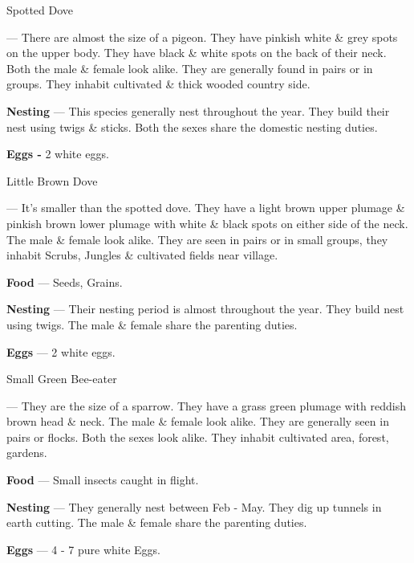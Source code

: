 \begin{bird}{Spotted Dove}

 --- There are almost the size of a pigeon. They have pinkish white \& grey spots on the upper body. They have black \& white spots on the back of their neck. Both the male \& female look alike. They are generally found in pairs or in groups. They inhabit cultivated \& thick wooded country side. 

{\large\bf Nesting} --- This species generally nest throughout the year. They build their nest using twigs \& sticks. Both the sexes share the domestic nesting duties.

{\large\bf Eggs -} 2 white eggs.
\end{bird}

\newpage

\begin{bird}{Little Brown Dove}

 --- It's smaller than the spotted dove. They have a light brown upper plumage \& pinkish brown lower plumage with white \& black spots on either side of the neck. The male \& female look alike. They are seen in pairs or in small groups, they inhabit Scrubs, Jungles \& cultivated fields near village. 

{\large\bf Food} --- Seeds, Grains.

{\large\bf Nesting} --- Their nesting period is almost throughout the year. They build nest using twigs. The male \& female share the parenting duties.

{\large\bf Eggs} --- 2 white eggs.
\end{bird}

\begin{bird}{Small Green Bee-eater}

 --- They are the size of a sparrow. They have a grass green plumage with reddish brown head \& neck. The male \& female look alike. They are generally seen in pairs or flocks. Both the sexes look alike. They inhabit cultivated area, forest, gardens.

{\large\bf Food} --- Small insects caught in flight.

{\large\bf Nesting} --- They generally nest between Feb - May. They dig up tunnels in earth cutting. The male \& female share the parenting duties.

{\large\bf Eggs} --- 4 - 7 pure white Eggs.
\end{bird}

